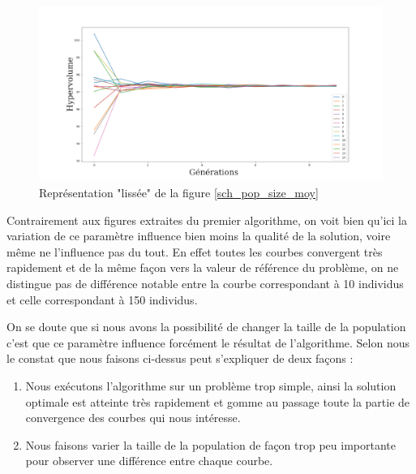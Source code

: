 \documentclass[12pt]{report}
\begin{document}
      \begin{figure}[!]
        \centering
        \includegraphics[width=18cm]{img/pop_size_sch_liss.png}
        \caption{Représentation "lissée" de la figure \ref{sch_pop_size_moy}}
        \label{sch_pop_size_liss}
      \end{figure}


      Contrairement aux figures extraites du premier algorithme, on voit bien qu'ici la variation de ce paramètre influence bien moins la qualité de la solution, voire même ne l'influence pas du tout. En effet toutes les courbes convergent très rapidement et de la même façon vers la valeur de référence du problème, on ne distingue pas de différence notable entre la courbe correspondant à 10 individus et celle correspondant à 150 individus.

      On se doute que si nous avons la possibilité de changer la taille de la population c'est que ce paramètre influence forcément le résultat de l'algorithme. Selon nous le constat que nous faisons ci-dessus peut s'expliquer de deux façons :
      \begin{enumerate}
        \item Nous exécutons l'algorithme sur un problème trop simple, ainsi la solution optimale est atteinte très rapidement et gomme au passage toute la partie de convergence des courbes qui nous intéresse.
        \item Nous faisons varier la taille de la population de façon trop peu importante pour observer une différence entre chaque courbe.
      \end{enumerate}
\end{document}

